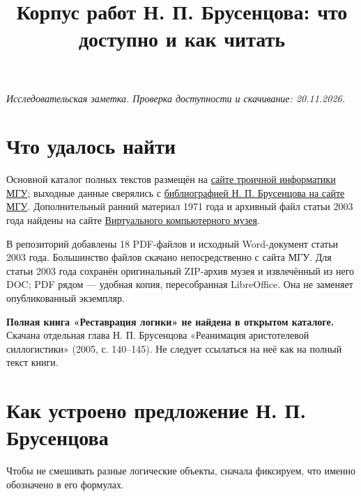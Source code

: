 \documentclass[12pt,a4paper]{article}
\title{Корпус работ Н. П. Брусенцова: что доступно и как читать}
\author{}
\date{}
\begin{document}
\maketitle

\emph{Исследовательская заметка. Проверка доступности и скачивание: 20.11.2026.}

\section{Что удалось найти}

Основной каталог полных текстов размещён на \href{https://ternarycomp.cs.msu.ru/all.html}{сайте троичной информатики МГУ}; выходные данные сверялись с \href{https://ternarycomp.cs.msu.ru/Brusentsov/Brusentsov_v2.html}{библиографией Н. П. Брусенцова на сайте МГУ}. Дополнительный ранний материал 1971 года и архивный файл статьи 2003 года найдены на сайте \href{https://computer-museum.ru/histussr/trilog0.htm}{Виртуального компьютерного музея}.

В репозиторий добавлены 18 PDF-файлов и исходный Word-документ статьи 2003 года. Большинство файлов скачано непосредственно с сайта МГУ. Для статьи 2003 года сохранён оригинальный ZIP-архив музея и извлечённый из него DOC; PDF рядом — удобная копия, пересобранная LibreOffice. Она не заменяет опубликованный экземпляр.

\textbf{Полная книга «Реставрация логики» не найдена в открытом каталоге.} Скачана отдельная глава Н. П. Брусенцова «Реанимация аристотелевой силлогистики» (2005, с. 140–145). Не следует ссылаться на неё как на полный текст книги.

\section{Как устроено предложение Н. П. Брусенцова}

Чтобы не смешивать разные логические объекты, сначала фиксируем, что именно обозначено в его формулах.
\end{document}

